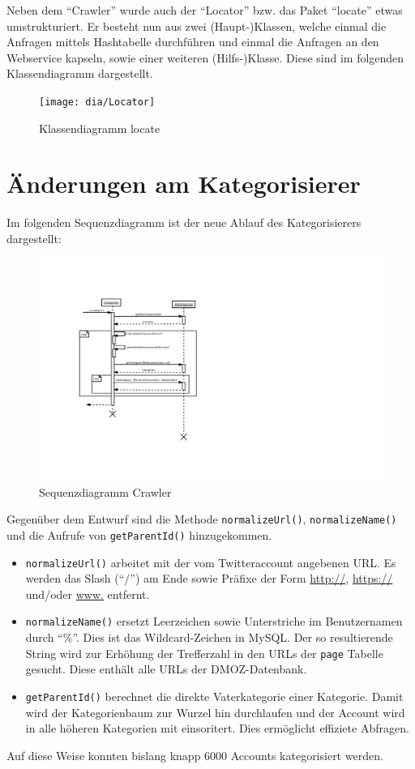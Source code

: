Neben dem "`Crawler"' wurde auch der "`Locator"' bzw. das Paket "`locate"' etwas umstrukturiert. Er besteht nun aus zwei (Haupt-)Klassen, welche einmal die Anfragen mittels Hashtabelle durchführen und einmal die Anfragen an den Webservice kapseln, sowie einer weiteren (Hilfs-)Klasse. Diese sind im folgenden Klassendiagramm dargestellt.
 \begin{figure}[H]
 	\centering
 	\texttt{[image: dia/Locator]}
 	\caption{Klassendiagramm locate}
 	\label{fig:locate}
 \end{figure}

\section{Änderungen am Kategorisierer}
Im folgenden Sequenzdiagramm ist der neue Ablauf des Kategorisierers dargestellt:
\begin{figure}[H]
	\centering
	\includegraphics[width=\textwidth,height=\textheight,keepaspectratio=true]{dia/categorizerSequence}
	\caption{Sequenzdiagramm Crawler}
	\label{fig:Crawler}
\end{figure}
Gegenüber dem Entwurf sind die Methode \lstinline{normalizeUrl()}, \lstinline{normalizeName()} und die Aufrufe von \lstinline{getParentId()} hinzugekommen.
\begin{itemize}
	\item \lstinline{normalizeUrl()} arbeitet mit der vom Twitteraccount angebenen URL. Es werden das Slash ("`/"') am Ende sowie Präfixe der Form \url{http://}, \url{https://} und/oder \url{www.} entfernt.
	\item \lstinline{normalizeName()} ersetzt Leerzeichen sowie Unterstriche im Benutzernamen durch "`\%"'. Dies ist das Wildcard-Zeichen in MySQL. Der so resultierende String wird zur Erhöhung der Trefferzahl in den URLs der \lstinline{page} Tabelle gesucht. Diese enthält alle URLs der DMOZ-Datenbank.
	\item \lstinline{getParentId()} berechnet die direkte Vaterkategorie einer Kategorie. Damit wird der Kategorienbaum zur Wurzel hin durchlaufen und der Account wird in alle höheren Kategorien mit einsoritert. Dies ermöglicht effiziete Abfragen.
\end{itemize}
Auf diese Weise konnten bislang knapp 6000 Accounts kategorisiert werden.

